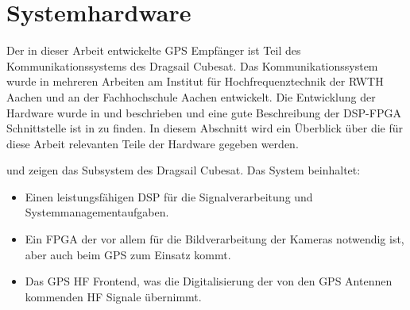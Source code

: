 \section{Systemhardware}
Der in dieser Arbeit entwickelte GPS Empfänger ist Teil des Kommunikationssystems des Dragsail Cubesat. Das Kommunikationssystem wurde in mehreren Arbeiten am Institut für Hochfrequenztechnik der RWTH Aachen und an der Fachhochschule Aachen entwickelt. Die Entwicklung der \comboard Hardware wurde in \cite{DragsailKaiMA} und \cite{DragsailMattiMA} beschrieben und eine gute Beschreibung der DSP-FPGA Schnittstelle ist in \cite{DragsailAndrejMA} zu finden.
In diesem Abschnitt wird ein Überblick über die für diese Arbeit relevanten Teile der \comboard Hardware gegeben werden. 



 und  zeigen das \comboard Subsystem des Dragsail Cubesat. Das System beinhaltet: 
\begin{itemize}
\item Einen leistungsfähigen \gls{DSP} für die Signalverarbeitung und Systemmanagementaufgaben.
\item Ein \gls{FPGA} der vor allem für die Bildverarbeitung der Kameras notwendig ist, aber auch beim GPS zum Einsatz kommt.
\item Das GPS HF Frontend, was die Digitalisierung der von den GPS Antennen kommenden HF Signale übernimmt.
\end{itemize}


